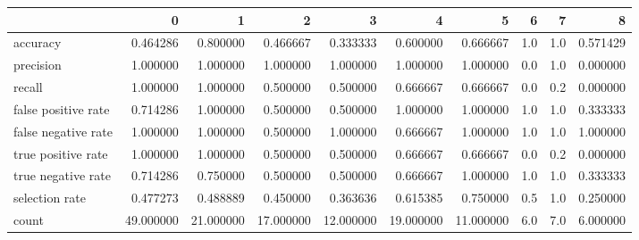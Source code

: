 \begin{tabular}{lrrrrrrrrr}
\toprule
{} &          0 &          1 &          2 &          3 &          4 &          5 &    6 &    7 &         8 \\
\midrule
accuracy            &   0.464286 &   0.800000 &   0.466667 &   0.333333 &   0.600000 &   0.666667 &  1.0 &  1.0 &  0.571429 \\
precision           &   1.000000 &   1.000000 &   1.000000 &   1.000000 &   1.000000 &   1.000000 &  0.0 &  1.0 &  0.000000 \\
recall              &   1.000000 &   1.000000 &   0.500000 &   0.500000 &   0.666667 &   0.666667 &  0.0 &  0.2 &  0.000000 \\
false positive rate &   0.714286 &   1.000000 &   0.500000 &   0.500000 &   1.000000 &   1.000000 &  1.0 &  1.0 &  0.333333 \\
false negative rate &   1.000000 &   1.000000 &   0.500000 &   1.000000 &   0.666667 &   1.000000 &  1.0 &  1.0 &  1.000000 \\
true positive rate  &   1.000000 &   1.000000 &   0.500000 &   0.500000 &   0.666667 &   0.666667 &  0.0 &  0.2 &  0.000000 \\
true negative rate  &   0.714286 &   0.750000 &   0.500000 &   0.500000 &   0.666667 &   1.000000 &  1.0 &  1.0 &  0.333333 \\
selection rate      &   0.477273 &   0.488889 &   0.450000 &   0.363636 &   0.615385 &   0.750000 &  0.5 &  1.0 &  0.250000 \\
count               &  49.000000 &  21.000000 &  17.000000 &  12.000000 &  19.000000 &  11.000000 &  6.0 &  7.0 &  6.000000 \\
\bottomrule
\end{tabular}
